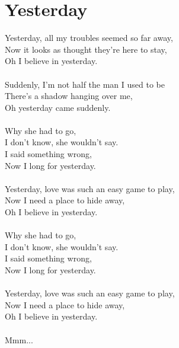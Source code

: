 \section{Yesterday}
Yesterday, all my troubles seemed so far away,\\
Now it looks as thought they're here to stay,\\
Oh I believe in yesterday.\\
\\
Suddenly, I'm not half the man I used to be\\
There's a shadow hanging over me,\\
Oh yesterday came suddenly.\\
\\
Why she had to go,\\
I don't know, she wouldn't say.\\
I said something wrong,\\
Now I long for yesterday.\\
\\
Yesterday, love was such an easy game to play,\\
Now I need a place to hide away,\\
Oh I believe in yesterday.\\
\\
Why she had to go,\\
I don't know, she wouldn't say.\\
I said something wrong,\\
Now I long for yesterday.\\
\\
Yesterday, love was such an easy game to play,\\
Now I need a place to hide away,\\
Oh I believe in yesterday.\\
\\
Mmm...\\